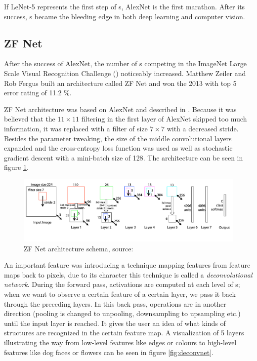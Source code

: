 If LeNet-5 represents the first step of s, AlexNet is the first marathon. After its success, s became the bleeding edge in both deep learning and computer vision. 


\subsection{ZF Net}
\label{zfnet}

After the success of AlexNet, the number of s competing in the ImageNet Large Scale Visual Recognition Challenge () noticeably increased. Matthew Zeiler and Rob Fergus built an architecture called ZF Net and won the  2013 with top 5 error rating of 11.2 \%. 

ZF Net architecture was based on AlexNet and described in \cite{zf-net}. Because it was believed that the $11 \times 11$ filtering in the first layer of AlexNet skipped too much information, it was replaced with a filter of size $7 \times 7$ with a decreased stride. Besides the parameter tweaking, the size of the middle convolutional layers expanded and the cross-entropy loss function was used as well as stochastic gradient descent with a mini-batch size of 128. The architecture can be seen in figure \ref{fig:zf-net}.

\begin{figure}[H]
   \centering
	\includegraphics[width=\linewidth]{./pictures/zf-net.png}
	\caption[ZF Net architecture]{ZF Net architecture schema, source: \cite{zf-net}}
      \label{fig:zf-net}
\end{figure}

An important feature was introducing a technique mapping features from feature maps back to pixels, due to its character this technique is called a \textit{deconvolutional network}. During the forward pass, activations are computed at each level of s; when we want to observe a certain feature of a certain layer, we pass it back through the preceding layers. In this back pass, operations are in another direction (pooling is changed to unpooling, downsampling to upsampling etc.) until the input layer is reached. It gives the user an idea of what kinds of structures are recognized in the certain feature map. A visualization of 5 layers illustrating the way from low-level features like edges or colours to high-level features like dog faces or flowers can be seen in figure \ref{fig:deconvnet}.


